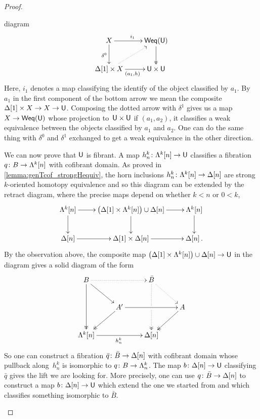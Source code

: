 \documentclass[reqno,10pt,a4paper,oneside,draft]{amsart}
\begin{document}
\begin{proof}
\begin{enumerate}[(i)]
diagram
\[
\xymatrix{ X \ar[r]^{i_1} \ar[d]_{\delta^0} & \mathsf{Weq}(\U) \ar@{->>}[d] \\
\Delta[1] \times X \ar[r]_{(a_1,h)} \ar@{.>}[ur] & \U \times \U
}
\]
Here, $i_1$ denotes a map classifying the identify of the object classified by $a_1$. By $a_1$ in the first component of the bottom arrow we mean the composite $\Delta[1] \times X \rightarrow X \rightarrow \mathsf{U}$. Composing the dotted arrow with $\delta^1$ gives us a map $X \rightarrow  \mathsf{Weq}(\mathsf{U})$ whose projection to~$\mathsf{U} \times \mathsf{U}$ if $(a_1,a_2)$, \ie it classifies a weak equivalence between the objects classified by $a_1$ and $a_2$. One can do the same thing with $\delta^0$ and $\delta^1$ exchanged to get a weak equivalence in the other direction.


We can now prove that $\mathsf{U}$ is fibrant. A map $h^k_n \colon \Lambda^k[n] \rightarrow \mathsf{U} $ classifies a fibration $q \colon B \rightarrow \Lambda^k[n]$ with cofibrant domain. As proved in \cref{lemma:genTcof_strongHequiv}, the horn inclusions $h^k_n \colon \Lambda^k [n] \rightarrow \Delta[n]$ are strong $k$-oriented homotopy equivalence and so this diagram can be extended by the retract diagram, where the precise maps depend on whether $k<n$ or $0 < k$,
\[
\xymatrix{\Lambda^k[n] \ar[d] \ar[r] & \big( \Delta[1] \times \Lambda^k[n] \big) \cup \Delta[n] \ar[d] \ar[r] & \Lambda^k[n] \ar[d]  \\
\Delta[n] \ar[r] & \Delta[1] \times \Delta[n] \ar[r] & \Delta[n] \, .
}\]
By the observation above, the composite map $\big( \Delta[1] \times \Lambda^k[n]  \big) \cup \Delta[n] \rightarrow \mathsf{U}$ in the diagram gives a solid diagram of the form
\[ 
\xymatrix{
  B
  \ar@{.>}[rr]
  \ar[dr]
  \ar@{->>}[dd]
&&
  \bar{B}
  \ar@{.>}[dr]
  \ar@{.>>}[dd]|{\hole}
&\\&
  A'
  \ar[rr]
  \ar@{->>}[dl]
&&
  A
  \ar@{->>}[dl]
\\
  \Lambda^k[n]
  \ar[rr]_{h^k_n}
&&
  \Delta[n]
&
}
\] 
So one can construct a fibration  $\bar{q} \colon \bar{B} \to \Delta[n]$ with cofibrant domain whose pullback 
along~$h^k_n$ is isomorphic to $q \colon B \to \Lambda^k_n$. The map $b \colon \Delta[n] \rightarrow \mathsf{U}$ classifying $\bar{q}$ gives the lift we are looking for. More precisely, one can use $q  \colon \bar{B} \to
\Delta[n]$ to construct  a map $b \colon \Delta[n] \rightarrow \mathsf{U}$ which extend the one we started from and which classifies something isomorphic to $\bar{B}$. \qedhere
\end{enumerate}
\end{proof}
\end{document}
